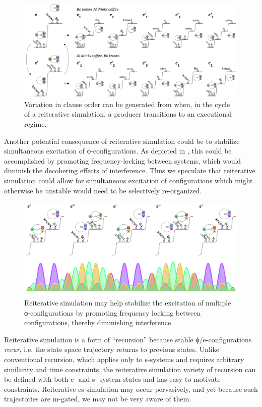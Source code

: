   
\begin{figure}
\includegraphics[width=\textwidth]{figures/Tilsen-img116.png}
\caption{Variation in clause order can be generated from when, in the cycle of a reiterative simulation, a producer transitions to an executional regime.}
\label{fig:5:12}
\end{figure}
 

  Another potential consequence of reiterative simulation could be to stabilize simultaneous excitation of ϕ-configurations. As depicted in {}, this could be accomplished by promoting frequency-locking between systems, which would diminish the decohering effects of interference. Thus we speculate that reiterative simulation could allow for simultaneous excitation of configurations which might otherwise be unstable would need to be selectively re-organized.

  
\begin{figure}
\includegraphics[width=\textwidth]{figures/Tilsen-img117.png}
\caption{Reiterative simulation may help stabilize the excitation of multiple ϕ-configurations by promoting frequency locking between configurations, thereby diminishing interference.}
\label{fig:5:13}
\end{figure}
 

  Reiterative simulation is a form of “recursion” because stable ϕ/e-configurations \textit{recur}, i.e. the state space trajectory returns to previous states. Unlike conventional recursion, which applies only to s-systems and requires arbitrary similarity and time constraints, the reiterative simulation variety of recursion can be defined with both c- and s- system states and has easy-to-motivate constraints. Reiterative cs-simulation may occur pervasively, and yet because such trajectories are m-gated, we may not be very aware of them. 

